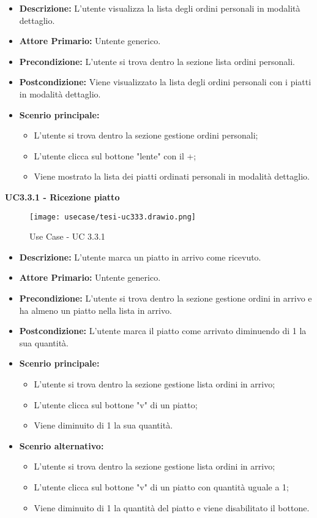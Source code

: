 \begin{itemize}
    \item \textbf{Descrizione:} L'utente visualizza la lista degli ordini personali in modalità dettaglio.
    \item \textbf{Attore Primario:} Untente generico.
    \item \textbf{Precondizione:} L'utente si trova dentro la sezione lista ordini personali.
    \item \textbf{Postcondizione:} Viene visualizzato la lista degli ordini personali con i piatti in modalità dettaglio.
    \item \textbf{Scenrio principale:}
    \begin{itemize}
        \item L'utente si trova dentro la sezione gestione ordini personali;
        \item L'utente clicca sul bottone "lente" con il +;
        \item Viene mostrato la lista dei piatti ordinati personali in modalità dettaglio.
    \end{itemize}
\end{itemize}
\textbf{UC3.3.1 - Ricezione piatto}
\begin{figure}[H]
    \centering
    \texttt{[image: usecase/tesi-uc333.drawio.png]}
    \caption{Use Case - UC 3.3.1}
\end{figure}
\begin{itemize}
    \item \textbf{Descrizione:} L'utente marca un piatto in arrivo come ricevuto.
    \item \textbf{Attore Primario:} Untente generico.
    \item \textbf{Precondizione:} L'utente si trova dentro la sezione gestione ordini in arrivo e ha almeno un piatto nella lista in arrivo.
    \item \textbf{Postcondizione:} L'utente marca il piatto come arrivato diminuendo di 1 la sua quantità.
    \item \textbf{Scenrio principale:}
    \begin{itemize}
        \item L'utente si trova dentro la sezione gestione lista ordini in arrivo;
        \item L'utente clicca sul bottone "v" di un piatto;
        \item Viene diminuito di 1 la sua quantità.
    \end{itemize}
    \item \textbf{Scenrio alternativo:}
    \begin{itemize}
        \item L'utente si trova dentro la sezione gestione lista ordini in arrivo;
        \item L'utente clicca sul bottone "v" di un piatto con quantità uguale a 1;
        \item Viene diminuito di 1 la quantità del piatto e viene disabilitato il bottone.
    \end{itemize}
\end{itemize}

